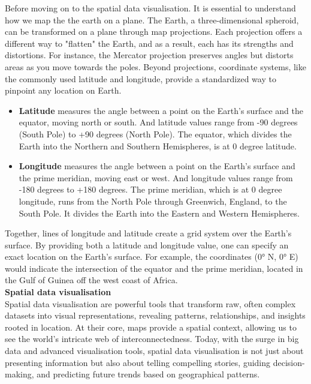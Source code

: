 \documentclass{article}\usepackage[]{graphicx}\usepackage[]{xcolor}
\begin{document}
\noindent
Before moving on to the spatial data visualisation. It is essential to understand how we map the the earth on a plane. The Earth, a three-dimensional spheroid, can be transformed on a plane through map projections. Each projection offers a different way to "flatten" the Earth, and as a result, each has its strengths and distortions. For instance, the Mercator projection preserves angles but distorts areas as you move towards the poles. Beyond projections, coordinate systems, like the commonly used latitude and longitude, provide a standardized way to pinpoint any location on Earth.

\begin{itemize}
\item \textbf{Latitude} measures the angle between a point on the Earth's surface and the equator, moving north or south. And latitude values range from -90 degrees (South Pole) to +90 degrees (North Pole). The equator, which divides the Earth into the Northern and Southern Hemispheres, is at 0 degree latitude.
\item \textbf{Longitude} measures the angle between a point on the Earth's surface and the prime meridian, moving east or west.
And longitude values range from -180 degrees to +180 degrees. The prime meridian, which is at 0 degree longitude, runs from the North Pole through Greenwich, England, to the South Pole. It divides the Earth into the Eastern and Western Hemispheres.
\end{itemize}

\noindent
Together, lines of longitude and latitude create a grid system over the Earth's surface. By providing both a latitude and longitude value, one can specify an exact location on the Earth's surface. For example, the coordinates (0° N, 0° E) would indicate the intersection of the equator and the prime meridian, located in the Gulf of Guinea off the west coast of Africa.\\

\noindent
\textbf{Spatial data visualisation}\\

\noindent
Spatial data visualisation are powerful tools that transform raw, often complex datasets into visual representations, revealing patterns, relationships, and insights rooted in location. At their core, maps provide a spatial context, allowing us to see the world's intricate web of interconnectedness. Today, with the surge in big data and advanced visualisation tools, spatial data visualisation is not just about presenting information but also about telling compelling stories, guiding decision-making, and predicting future trends based on geographical patterns.
\end{document}
